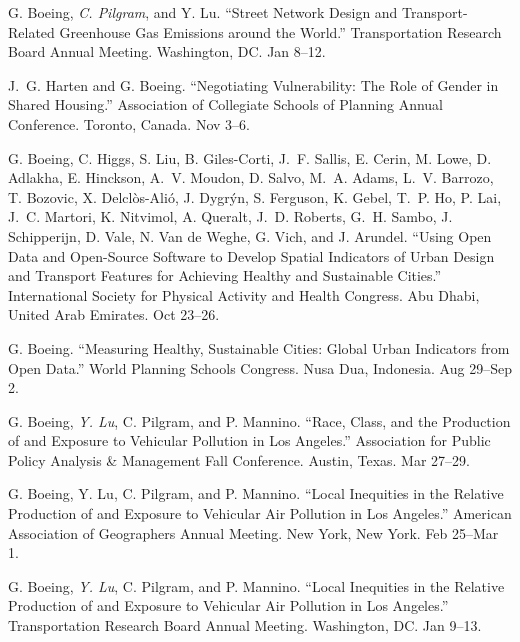 \documentclass[11pt,a4paper]{report} %
\begin{document}
\begin{tablist}
\item[2023] \tab{}G. Boeing, \textit{C. Pilgram}, and Y. Lu. \enquote{Street Network Design and Transport-Related Greenhouse Gas Emissions around the World.} Transportation Research Board Annual Meeting. Washington, DC\@. Jan 8--12.

\item[2022] \tab{}J.~G. Harten and G. Boeing. \enquote{Negotiating Vulnerability: The Role of Gender in Shared Housing.} Association of Collegiate Schools of Planning Annual Conference. Toronto, Canada. Nov 3--6.

\item[2022] \tab{}G. Boeing, C. Higgs, S. Liu, B. Giles-Corti, J.~F. Sallis, E. Cerin, M. Lowe, D. Adlakha, E. Hinckson, A.~V. Moudon, D. Salvo, M.~A. Adams, L.~V. Barrozo, T. Bozovic, X. Delclòs-Alió, J. Dygrýn, S. Ferguson, K. Gebel, T.~P. Ho, P. Lai, J.~C. Martori, K. Nitvimol, A. Queralt, J.~D. Roberts, G.~H. Sambo, J. Schipperijn, D. Vale, N. Van de Weghe, G. Vich, and J. Arundel. \enquote{Using Open Data and Open-Source Software to Develop Spatial Indicators of Urban Design and Transport Features for Achieving Healthy and Sustainable Cities.} International Society for Physical Activity and Health Congress. Abu Dhabi, United Arab Emirates. Oct 23--26.

\item[2022] \tab{}G. Boeing. \enquote{Measuring Healthy, Sustainable Cities: Global Urban Indicators from Open Data.} World Planning Schools Congress. Nusa Dua, Indonesia. Aug 29--Sep 2.

\item[2022] \tab{}G. Boeing, \textit{Y. Lu}, C. Pilgram, and P. Mannino. \enquote{Race, Class, and the Production of and Exposure to Vehicular Pollution in Los Angeles.} Association for Public Policy Analysis \& Management Fall Conference. Austin, Texas. Mar 27--29.

\item[2022] \tab{}G. Boeing, Y. Lu, C. Pilgram, and P. Mannino. \enquote{Local Inequities in the Relative Production of and Exposure to Vehicular Air Pollution in Los Angeles.} American Association of Geographers Annual Meeting. New York, New York. Feb 25--Mar 1.

\item[2022] \tab{}G. Boeing, \textit{Y. Lu}, C. Pilgram, and P. Mannino. \enquote{Local Inequities in the Relative Production of and Exposure to Vehicular Air Pollution in Los Angeles.} Transportation Research Board Annual Meeting. Washington, DC\@. Jan 9--13.


\end{tablist}
\end{document}
